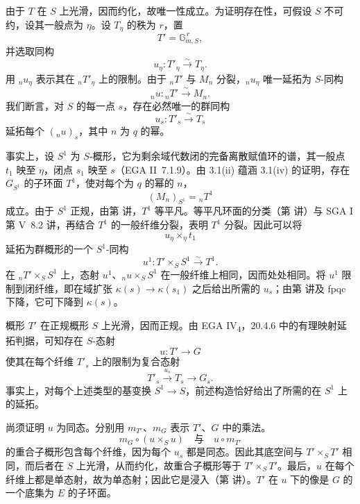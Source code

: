 
由于 \(T\) 在 \(S\) 上光滑，因而约化，故唯一性成立。为证明存在性，可假设 \(S\) 不可约，设其一般点为 \(\eta\)。设 \(T_\eta\) 的秩为 \(r\)，置
\[
  T'=\mathbb G_{m,S}^{\,r},
\]
并选取同构
\[
  u_\eta:T'_\eta\xrightarrow{\sim}T_\eta.
\]
用 \({}_nu_\eta\) 表示其在 \({}_nT'_\eta\) 上的限制。由于 \({}_nT'\) 与 \(M_n\) 分裂，\({}_nu_\eta\) 唯一延拓为 \(S\)-同构
\[
  {}_nu:{}_nT'\xrightarrow{\sim}M_n.
\]
我们断言，对 \(S\) 的每一点 \(s\)，存在必然唯一的群同构
\[
  u_s:T'_s\xrightarrow{\sim}T_s
\]
延拓每个 \(({}_nu)_s\)，其中 \(n\) 为 \(q\) 的幂。

事实上，设 \(S^1\) 为 \(S\)-概形，它为剩余域代数闭的完备离散赋值环的谱，其一般点 \(t_1\) 映至 \(\eta\)，闭点 \(s_1\) 映至 \(s\)（EGA II~7.1.9）。由 3.1(ii) 蕴涵 3.1(iv) 的证明，存在 \(G_{S^1}\) 的子环面 \(T^1\)，使对每个为 \(q\) 的幂的 \(n\)，
\[
  (M_n)_{S^1}={}_nT^1
\]
成立。由于 \(S^1\) 正规，由第  讲，\(T^1\) 等平凡。等平凡环面的分类（第  讲）与 SGA I 第 V~8.2 讲，再结合 \(T^1\) 的一般纤维分裂，表明 \(T^1\) 分裂。因此可以将
\[
  u_\eta\times_\eta t_1
\]
延拓为群概形的一个 \(S^1\)-同构
\[
  u^1:T'\times_S S^1\xrightarrow{\sim}T^1.
\]
在 \({}_nT'\times_S S^1\) 上，态射 \(u^1\)、\({}_nu\times_S S^1\) 在一般纤维上相同，因而处处相同。将 \(u^1\) 限制到闭纤维，即在域扩张 \(\kappa(s)\to\kappa(s_1)\) 之后给出所需的 \(u_s\)；由第  讲及 fpqc 下降，它可下降到 \(\kappa(s)\)。

概形 \(T'\) 在正规概形 \(S\) 上光滑，因而正规。由 EGA IV\textsubscript{4}，20.4.6 中的有理映射延拓判据，可知存在 \(S\)-态射
\[
  u:T'\longrightarrow G
\]
使其在每个纤维 \(T'_s\) 上的限制为复合态射
\[
  T'_s\xrightarrow{u_s}T_s\longrightarrow G_s.
\]
事实上，对每个上述类型的基变换 \(S^1\to S\)，前述构造恰好给出了所需的在 \(S^1\) 上的延拓。

尚须证明 \(u\) 为同态。分别用 \(m_{T'}\)、\(m_G\) 表示 \(T'\)、\(G\) 中的乘法。
\[
  m_G\circ(u\times_Su)
  \quad\text{与}\quad
  u\circ m_{T'}
\]
的重合子概形包含每个纤维，因为每个 \(u_s\) 都是同态。因此其底空间与 \(T'\times_S T'\) 相同，而后者在 \(S\) 上光滑，从而约化，故重合子概形等于 \(T'\times_S T'\)。最后，\(u\) 在每个纤维上都是单态射，故为单态射；因此它是浸入（第  讲）。\(T'\) 在 \(u\) 下的像是 \(G\) 的一个底集为 \(E\) 的子环面。

